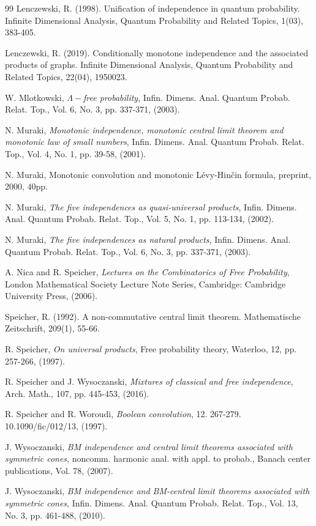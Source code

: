 \documentclass[a4paper,12pt]{extarticle}
\theoremstyle{definition}
\theoremstyle{remark}
\begin{document}
\begin{thebibliography}{99}
 Lenczewski, R. (1998). Unification of independence in quantum probability. Infinite Dimensional Analysis, Quantum Probability and Related Topics, 1(03), 383-405.
 
Lenczewski, R. (2019). Conditionally monotone independence and the associated products of graphs. Infinite Dimensional Analysis, Quantum Probability and Related Topics, 22(04), 1950023.


	
	 W. Mlotkowski, \emph{{$\Lambda-$}free probability}, Infin. Dimens. Anal. Quantum Probab. Relat. Top., Vol. 6, No. 3, pp. 337-371, (2003).
	
	 N. Muraki, \emph{Monotonic independence, monotonic central limit theorem and monotonic law of small numbers}, Infin. Dimens. Anal. Quantum Probab. Relat. Top., Vol. 4, No. 1, pp. 39-58, (2001).

 
          N. Muraki, Monotonic convolution and monotonic Lévy-Hinčin formula, preprint, 2000, 40pp.
	
	 N. Muraki, \emph{The five independences as quasi-universal products}, Infin. Dimens. Anal. Quantum Probab. Relat. Top., Vol. 5, No. 1, pp. 113-134, (2002).
	
	 N. Muraki, \emph{The five independences as natural products}, Infin. Dimens. Anal. Quantum Probab. Relat. Top., Vol. 6, No. 3, pp. 337-371, (2003).

 	A. Nica and  R. Speicher, \emph{Lectures on the Combinatorics of Free Probability}, London Mathematical Society Lecture Note Series, Cambridge: Cambridge University Press, (2006).

  

 Speicher, R. (1992). A non-commutative central limit theorem. Mathematische Zeitschrift, 209(1), 55-66.
  
	 R. Speicher, \emph{On universal products}, Free probability theory, Waterloo, 12, pp. 257-266, (1997).

 	
	 R. Speicher and J. Wysoczanski, \emph{Mixtures of classical and free independence}, Arch. Math., 107, pp. 445-453, (2016).
	
	 R. Speicher and R. Woroudi, \emph{Boolean convolution}, 12. 267-279. 10.1090/fic/012/13, (1997).


	
	 J. Wysoczanski, \emph{BM independence and central limit theorems associated with symmetric cones}, noncomm. harmonic anal. with appl. to probab., Banach center publications, Vol. 78, (2007).
	
	
	 J. Wysoczanski, \emph{BM independence and BM-central limit theorems associated with symmetric cones}, Infin. Dimens. Anal. Quantum Probab. Relat. Top., Vol. 13, No. 3, pp. 461-488, (2010).
	


\end{thebibliography}
\end{document}
